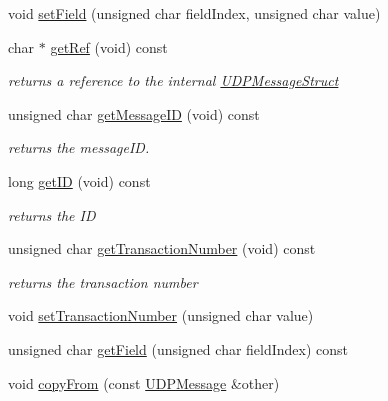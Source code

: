 \begin{DoxyCompactItemize}
void \hyperlink{class_u_d_p_message_ad7f1c729cf357be18e6cda695f5e5d99}{set\+Field} (unsigned char field\+Index, unsigned char value)
\item 
\mbox{\label{class_u_d_p_message_aeea2288e53b4c6db7861181b5fc8aa5e}} 
char $\ast$ \hyperlink{class_u_d_p_message_aeea2288e53b4c6db7861181b5fc8aa5e}{get\+Ref} (void) const
\begin{DoxyCompactList}\small\item\em returns a reference to the internal \hyperlink{struct_u_d_p_message_struct}{U\+D\+P\+Message\+Struct} \end{DoxyCompactList}\item 
\mbox{\label{class_u_d_p_message_a9e762f6c16fa298afe87b9dd6cee41c2}} 
unsigned char \hyperlink{class_u_d_p_message_a9e762f6c16fa298afe87b9dd6cee41c2}{get\+Message\+ID} (void) const
\begin{DoxyCompactList}\small\item\em returns the message\+ID. \end{DoxyCompactList}\item 
\mbox{\label{class_u_d_p_message_add45e9751d72e7d789ed6dcdb06c23d2}} 
long \hyperlink{class_u_d_p_message_add45e9751d72e7d789ed6dcdb06c23d2}{get\+ID} (void) const
\begin{DoxyCompactList}\small\item\em returns the ID \end{DoxyCompactList}\item 
\mbox{\label{class_u_d_p_message_a65fed9ee9c6dc936e1c9d1ae3052d1f7}} 
unsigned char \hyperlink{class_u_d_p_message_a65fed9ee9c6dc936e1c9d1ae3052d1f7}{get\+Transaction\+Number} (void) const
\begin{DoxyCompactList}\small\item\em returns the transaction number \end{DoxyCompactList}\item 
void \hyperlink{class_u_d_p_message_a27629d5cab43160d53cedfd894e1c216}{set\+Transaction\+Number} (unsigned char value)
\item 
unsigned char \hyperlink{class_u_d_p_message_a869585e0916d3b9edf99111f8fc74709}{get\+Field} (unsigned char field\+Index) const
\item 
void \hyperlink{class_u_d_p_message_a313c116a2f7f0f134745ed0c4a759733}{copy\+From} (const \hyperlink{class_u_d_p_message}{U\+D\+P\+Message} \&other)
\end{DoxyCompactItemize}


